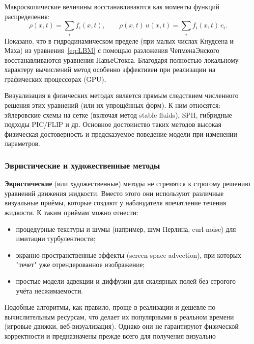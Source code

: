 Макроскопические величины восстанавливаются как моменты функций
распределения:
\[
  \rho(x, t)
  = \sum_i f_i(x, t),
  \qquad
  \rho(x, t)\, u(x, t)
  = \sum_i f_i(x, t)\, c_i .
\]
Показано, что в гидродинамическом пределе (при малых числах Кнудсена
и Маха) из уравнения~\eqref{eq:LBM} с помощью разложения
Чепмена\textemdash{}Энского восстанавливаются уравнения Навье\textemdash{}Стокса.
Благодаря полностью локальному характеру вычислений метод особенно
эффективен при реализации на графических процессорах (GPU).
\bigskip

Визуализация в физических методах является прямым следствием численного решения
этих уравнений (или их упрощённых форм). К ним относятся:
эйлеровские схемы на сетке (включая метод stable fluids), SPH,
гибридные подходы PIC/FLIP и др. Основное достоинство таких методов \textemdash{}
высокая физическая достоверность и предсказуемое поведение модели при
изменении параметров.

\subsubsection{Эвристические и художественные методы}

\textbf{Эвристические} (или художественные) методы не стремятся к строгому
решению уравнений движения жидкости. Вместо этого они используют различные
визуальные приёмы, которые создают у наблюдателя впечатление течения
жидкости. К таким приёмам можно отнести:
\begin{itemize}
  \item процедурные текстуры и шумы (например, шум Перлина, curl-noise)
        для имитации турбулентности;
  \item экранно-пространственные эффекты (screen-space advection), при
        которых "течет" уже отрендерованное изображение;
  \item простые модели адвекции и диффузии для скалярных полей без строгого
        учёта несжимаемости.
\end{itemize}

Подобные алгоритмы, как правило, проще в реализации и дешевле по
вычислительным ресурсам, что делает их популярными в реальном времени
(игровые движки, веб-визуализация). Однако они не гарантируют физической
корректности и предназначены прежде всего для получения визуально
